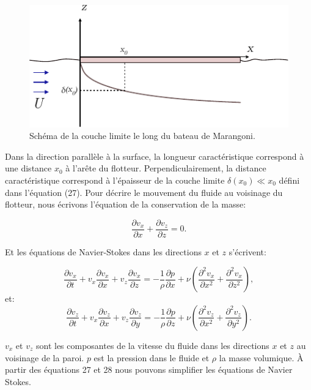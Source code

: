 \documentclass[french, 10pt]{article}
\begin{document}
\begin{figure}%
  \centering
  \includegraphics{couchelimitesketch.pdf}
  \caption{Schéma de la couche limite le long du bateau de Marangoni.}
  \label{fig:SketchCouchelimite}
\end{figure}

Dans la direction parallèle à la surface, la longueur caractéristique correspond à une distance $x_0$ à l'arête du flotteur. Perpendiculairement, la distance caractéristique correspond à l'épaisseur de la couche limite $\delta(x_0) \ll x_0$ défini dans l'équation (27). Pour décrire le mouvement du fluide au voisinage du flotteur, nous écrivons l'équation de la conservation de la masse:

\begin{equation}
  \frac{\partial v_x}{\partial x} + \frac{\partial v_z}{\partial z} = 0 \label{eq:consmass}.
\end{equation}

\noindent Et les équations de Navier-Stokes dans les directions $x$ et $z$ s'écrivent:

\begin{equation}
  \frac{\partial v_x}{\partial t} + v_x\frac{\partial v_x}{\partial x}+v_z\frac{\partial v_x}{\partial z} = -\frac{1}{\rho}\frac{\partial p}{\partial x} + \nu\left(\frac{\partial^2v_x}{\partial x^2}+\frac{\partial^2v_x}{\partial z^2} \right)\label{eq:NSx},
\end{equation}
et:
\begin{equation}
  \frac{\partial v_z}{\partial t} + v_x\frac{\partial v_z}{\partial x}+v_z\frac{\partial v_z}{\partial y} = -\frac{1}{\rho}\frac{\partial p}{\partial z} + \nu\left(\frac{\partial^2v_z}{\partial x^2}+\frac{\partial^2v_z}{\partial y^2} \right) \label{eq:NSz}.
\end{equation}

$v_x$ et $v_z$ sont les composantes de la vitesse du fluide dans les directions $x$ et $z$ au voisinage de la paroi. $p$ est la pression dans le fluide et $\rho$ la masse volumique. À partir des équations 27 et 28 nous pouvons simplifier les équations de Navier Stokes.
\end{document}
